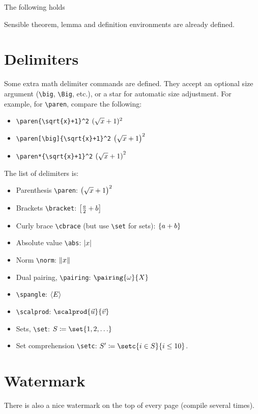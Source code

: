 \documentclass{scrartcl}
\begin{document}
The following holds
\begin{theorem}
Sensible theorem, lemma and definition environments are already defined.
\end{theorem}

\section{Delimiters}

Some extra math delimiter commands are defined.
They accept an optional size argument (\verb|\big|, \verb|\Big|, etc.), or a star for automatic size adjustment.
For example, for \verb|\paren|, compare the following:
\begin{itemize}
\item \verb|\paren{\sqrt{x}+1}^2| \(\paren{\sqrt{x}+1}^2\)
\item \verb|\paren[\big]{\sqrt{x}+1}^2| \(\paren[\big]{\sqrt{x}+1}^2\)
\item \verb|\paren*{\sqrt{x}+1}^2| \(\paren*{\sqrt{x}+1}^2\)
\end{itemize}

The list of delimiters is:

\begin{itemize}
\item Parenthesis \verb|\paren|: \(\paren[\big]{\sqrt{x} + 1}^2\)
  \item Brackets \verb|\bracket|: \(\bracket[\big]{\frac{a}{2}+b}\)
\item Curly brace \verb|\cbrace| (but use \verb|\set| for sets): \(\cbrace{a+b}\)
\item Absolute value \verb|\abs|: \(\abs{x}\)
\item Norm \verb|\norm|: \(\norm{x}\)
\item Dual pairing, \verb|\pairing|: \(\pairing{\omega}{X}\)
  \item \verb|\spangle|: \(\spangle{E}\)
\item \verb|\scalprod|: \(\scalprod{\vec{u}}{\vec{v}}\)
\item Sets, \verb|\set|: \(S \coloneqq \set{1,2,\ldots}\)
  \item Set comprehension \verb|\setc|: \(S' \coloneqq \setc{i \in S}{i \leq 10}\).
\end{itemize}

\section{Watermark}

There is also a nice watermark on the top of every page (compile several times).
\end{document}
